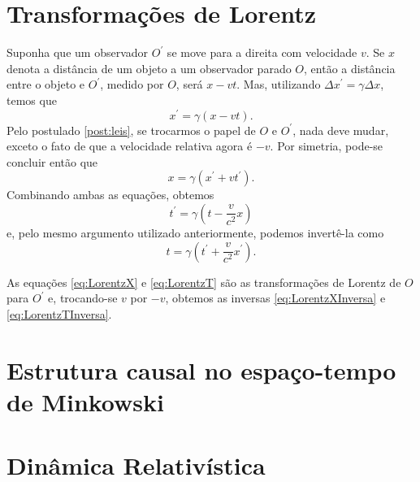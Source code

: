 \section{Transformações de Lorentz}

Suponha que um observador $O^\prime$ se move para a direita com velocidade $v$. Se $x$ denota a distância de um objeto a um observador parado $O$, então a distância entre o objeto e $O^\prime$, medido por $O$, será $x-vt$. Mas, utilizando $\Delta x^\prime = \gamma \Delta x$, temos que
\begin{equation}\label{eq:LorentzX}
    x^\prime = \gamma (x-vt).
\end{equation}
Pelo postulado \ref{post:leis}, se trocarmos o papel de $O$ e $O^\prime$, nada deve mudar, exceto o fato de que a velocidade relativa agora é $-v$. Por simetria, pode-se concluir então que
\begin{equation}\label{eq:LorentzXInversa}
    x = \gamma (x^\prime + vt^\prime) .
\end{equation}
Combinando ambas as equações, obtemos
\begin{equation}\label{eq:LorentzT}
    t^\prime = \gamma \left(t - \frac{v}{c^2}x\right)
\end{equation}
e, pelo mesmo argumento utilizado anteriormente, podemos invertê-la como
\begin{equation}\label{eq:LorentzTInversa}
    t = \gamma \left(t^\prime + \frac{v}{c^2}x^\prime\right) .
\end{equation}

As equações \eqref{eq:LorentzX} e \eqref{eq:LorentzT} são as transformações de Lorentz de $O$ para $O^\prime$ e, trocando-se $v$ por $-v$, obtemos as inversas \eqref{eq:LorentzXInversa} e \eqref{eq:LorentzTInversa}.

\section{Estrutura causal no espaço-tempo de Minkowski}

\section{Dinâmica Relativística}